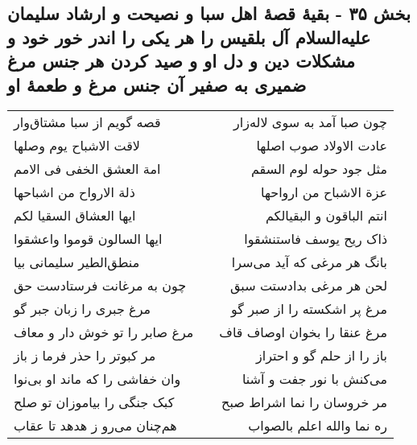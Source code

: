 \begin{center}
\section*{بخش ۳۵ - بقیهٔ قصهٔ اهل سبا و نصیحت و ارشاد سلیمان علیه‌السلام آل بلقیس را هر یکی را اندر خور خود و مشکلات دین و دل او و صید کردن هر جنس مرغ ضمیری به صفیر آن جنس مرغ و طعمهٔ او}
\label{sec:sh035}
\begin{longtable}{l p{0.5cm} r}
قصه گویم از سبا مشتاق‌وار
&&
چون صبا آمد به سوی لاله‌زار
\\
لاقت الاشباح یوم وصلها
&&
عادت الاولاد صوب اصلها
\\
امة العشق الخفی فی الامم
&&
مثل جود حوله لوم السقم
\\
ذلة الارواح من اشباحها
&&
عزة الاشباح من ارواحها
\\
ایها العشاق السقیا لکم
&&
انتم الباقون و البقیالکم
\\
ایها السالون قوموا واعشقوا
&&
ذاک ریح یوسف فاستنشقوا
\\
منطق‌الطیر سلیمانی بیا
&&
بانگ هر مرغی که آید می‌سرا
\\
چون به مرغانت فرستادست حق
&&
لحن هر مرغی بدادستت سبق
\\
مرغ جبری را زبان جبر گو
&&
مرغ پر اشکسته را از صبر گو
\\
مرغ صابر را تو خوش دار و معاف
&&
مرغ عنقا را بخوان اوصاف قاف
\\
مر کبوتر را حذر فرما ز باز
&&
باز را از حلم گو و احتراز
\\
وان خفاشی را که ماند او بی‌نوا
&&
می‌کنش با نور جفت و آشنا
\\
کبک جنگی را بیاموزان تو صلح
&&
مر خروسان را نما اشراط صبح
\\
هم‌چنان می‌رو ز هدهد تا عقاب
&&
ره نما والله اعلم بالصواب
\\
\end{longtable}
\end{center}
